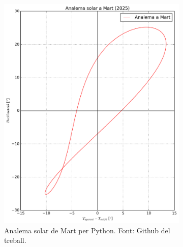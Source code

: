 \documentclass[a4paper, 11pt]{article}
\begin{document}
\begin{figure}[h!]
    \centering
    \begin{subfigure}{0.52\textwidth}
        \centering
        \includegraphics[width=\textwidth]{images/analema_Mart.png}
        \caption{Analema solar de Mart per Python. Font: Github del treball.}
    \end{subfigure}
    \hspace{0.05\textwidth}
    \begin{subfigure}{0.38\textwidth}
        \centering

\end{subfigure}
\end{figure}
\end{document}

